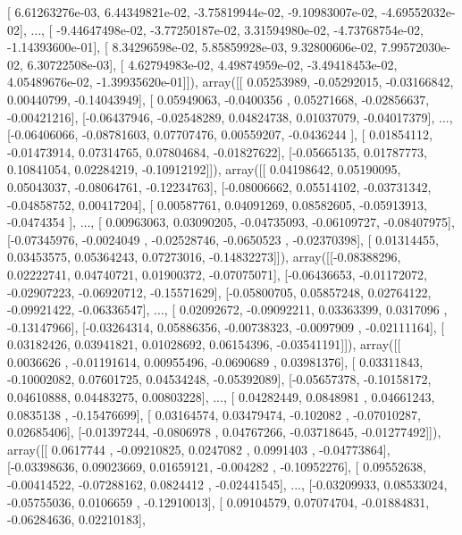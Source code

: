 \documentclass{article}
\begin{document}
       [  6.61263276e-03,   6.44349821e-02,  -3.75819944e-02,
         -9.10983007e-02,  -4.69552032e-02],
       ..., 
       [ -9.44647498e-02,  -3.77250187e-02,   3.31594980e-02,
         -4.73768754e-02,  -1.14393600e-01],
       [  8.34296598e-02,   5.85859928e-03,   9.32800606e-02,
          7.99572030e-02,   6.30722508e-03],
       [  4.62794983e-02,   4.49874959e-02,  -3.49418453e-02,
          4.05489676e-02,  -1.39935620e-01]]), array([[ 0.05253989, -0.05292015, -0.03166842,  0.00440799, -0.14043949],
       [ 0.05949063, -0.0400356 ,  0.05271668, -0.02856637, -0.00421216],
       [-0.06437946, -0.02548289,  0.04824738,  0.01037079, -0.04017379],
       ..., 
       [-0.06406066, -0.08781603,  0.07707476,  0.00559207, -0.0436244 ],
       [ 0.01854112, -0.01473914,  0.07314765,  0.07804684, -0.01827622],
       [-0.05665135,  0.01787773,  0.10841054,  0.02284219, -0.10912192]]), array([[ 0.04198642,  0.05190095,  0.05043037, -0.08064761, -0.12234763],
       [-0.08006662,  0.05514102, -0.03731342, -0.04858752,  0.00417204],
       [ 0.00587761,  0.04091269,  0.08582605, -0.05913913, -0.0474354 ],
       ..., 
       [ 0.00963063,  0.03090205, -0.04735093, -0.06109727, -0.08407975],
       [-0.07345976, -0.0024049 , -0.02528746, -0.0650523 , -0.02370398],
       [ 0.01314455,  0.03453575,  0.05364243,  0.07273016, -0.14832273]]), array([[-0.08388296,  0.02222741,  0.04740721,  0.01900372, -0.07075071],
       [-0.06436653, -0.01172072, -0.02907223, -0.06920712, -0.15571629],
       [-0.05800705,  0.05857248,  0.02764122, -0.09921422, -0.06336547],
       ..., 
       [ 0.02092672, -0.09092211,  0.03363399,  0.0317096 , -0.13147966],
       [-0.03264314,  0.05886356, -0.00738323, -0.0097909 , -0.02111164],
       [ 0.03182426,  0.03941821,  0.01028692,  0.06154396, -0.03541191]]), array([[ 0.0036626 , -0.01191614,  0.00955496, -0.0690689 ,  0.03981376],
       [ 0.03311843, -0.10002082,  0.07601725,  0.04534248, -0.05392089],
       [-0.05657378, -0.10158172,  0.04610888,  0.04483275,  0.00803228],
       ..., 
       [ 0.04282449,  0.0848981 ,  0.04661243,  0.0835138 , -0.15476699],
       [ 0.03164574,  0.03479474, -0.102082  , -0.07010287,  0.02685406],
       [-0.01397244, -0.0806978 ,  0.04767266, -0.03718645, -0.01277492]]), array([[ 0.0617744 , -0.09210825,  0.0247082 ,  0.0991403 , -0.04773864],
       [-0.03398636,  0.09023669,  0.01659121, -0.004282  , -0.10952276],
       [ 0.09552638, -0.00414522, -0.07288162,  0.0824412 , -0.02441545],
       ..., 
       [-0.03209933,  0.08533024, -0.05755036,  0.0106659 , -0.12910013],
       [ 0.09104579,  0.07074704, -0.01884831, -0.06284636,  0.02210183],
\end{document}
